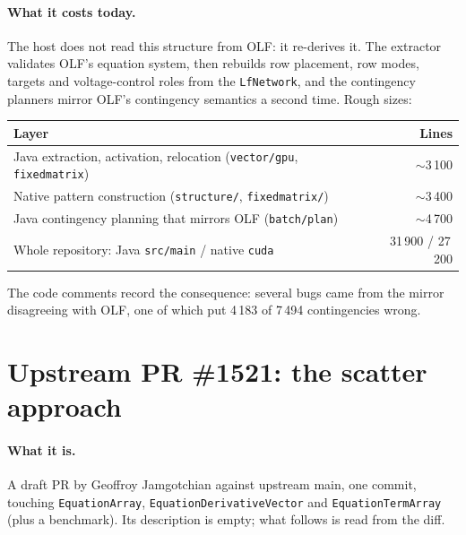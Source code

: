 \documentclass[11pt,a4paper]{article}
\newcommand{\code}[1]{\texttt{\small #1}}
\begin{document}
\paragraph{What it costs today.} The host does not read this structure from OLF: it
re-derives it. The extractor validates OLF's equation system, then rebuilds row
placement, row modes, targets and voltage-control roles from the \code{LfNetwork}, and
the contingency planners mirror OLF's contingency semantics a second time. Rough sizes:
\begin{center}
\begin{tabular}{lr}
\toprule
Layer & Lines \\
\midrule
Java extraction, activation, relocation (\code{vector/gpu}, \code{fixedmatrix}) & $\sim$3\,100 \\
Native pattern construction (\code{structure/}, \code{fixedmatrix/}) & $\sim$3\,400 \\
Java contingency planning that mirrors OLF (\code{batch/plan}) & $\sim$4\,700 \\
\midrule
Whole repository: Java \code{src/main} / native \code{cuda} & 31\,900 / 27\,200 \\
\bottomrule
\end{tabular}
\end{center}
The code comments record the consequence: several bugs came from the mirror disagreeing
with OLF, one of which put 4\,183 of 7\,494 contingencies wrong.

\section{Upstream PR \#1521: the scatter approach}

\paragraph{What it is.} A draft PR by Geoffroy Jamgotchian against upstream main, one
commit, touching \code{EquationArray}, \code{EquationDerivativeVector} and
\code{EquationTermArray} (plus a benchmark). Its description is empty; what follows is
read from the diff.
\end{document}

